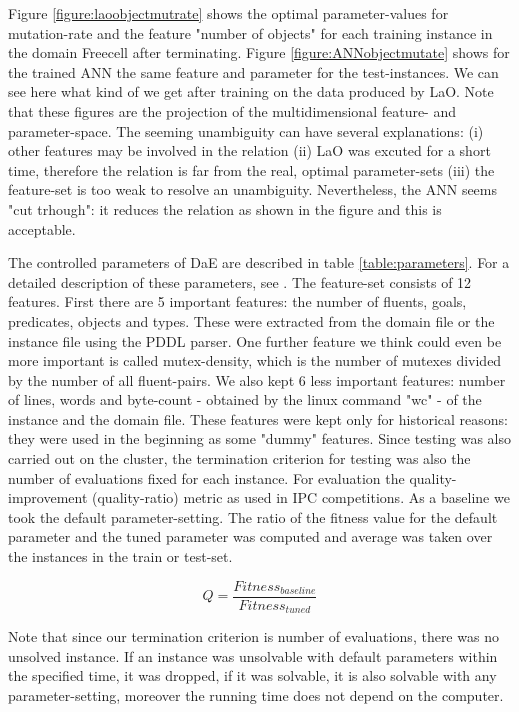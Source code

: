 \documentclass[letterpaper]{article}
\begin{document}
Figure \ref{figure:laoobjectmutrate} shows the optimal parameter-values for mutation-rate and the feature "number of objects" for each training instance in the domain Freecell after terminating. Figure \ref{figure:ANNobjectmutate} shows for the trained ANN the same feature and parameter for the test-instances. We can see here what kind of we get after training on the data produced by LaO. Note that these figures are the projection of the multidimensional feature- and parameter-space. The seeming unambiguity can have several explanations: (i) other features may be involved in the relation (ii) LaO was excuted for a short time, therefore the relation is far from the real, optimal parameter-sets (iii) the feature-set is too weak to resolve an unambiguity. Nevertheless, the ANN seems "cut trhough": it reduces the relation as shown in the figure and this is acceptable.

The controlled parameters of DaE are described in table \ref{table:parameters}. For a detailed description of these parameters, see \cite{BibGECCO:2010}. The feature-set consists of 12 features. First there are 5 important features: the number of fluents, goals, predicates, objects and types. These were extracted from the domain file or the instance file using the PDDL parser. One further feature we think could even be more important is called mutex-density, which is the number of mutexes divided by the number of all fluent-pairs. We also kept 6 less important features: number of lines, words and byte-count - obtained by the linux command "wc" - of the instance and the domain file. These features were kept only for historical reasons: they were used in the beginning as some "dummy" features. Since testing was also carried out on the cluster, the termination criterion for testing was also the number of evaluations fixed for each instance. For evaluation the quality-improvement (quality-ratio) metric as used in IPC competitions. As a baseline we took the default parameter-setting. The ratio of the fitness value for the default parameter and the tuned parameter was computed and average was taken over the instances in the train or test-set. 

\begin{equation}Q=\frac{Fitness_{baseline}}{Fitness_{tuned}}\end{equation}

Note that since our termination criterion is number of evaluations, there was no unsolved instance. If an instance was unsolvable with default parameters within the specified time, it was dropped, if it was solvable, it is also solvable with any parameter-setting, moreover the running time does not depend on the computer. 
\end{document}

